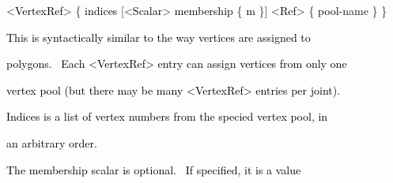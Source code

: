 \documentclass[a4paper]{article}
\newcommand\textstyleOOoComputerKeyWord[1]{\textrm{\textcolor[rgb]{0.0,0.0,0.5019608}{#1}}}
\newcommand\textstyleOOoAssemblerSpecialChar[1]{\textrm{\textcolor[rgb]{0.0,0.5019608,0.0}{#1}}}
\newcommand\textstyleOOoAssemblerIdent[1]{\textrm{\textcolor{black}{#1}}}
\newcommand\textstyleOOoAssemblerDirective[1]{\textrm{\textcolor[rgb]{0.0,0.5019608,1.0}{#1}}}
\begin{document}
{\color{black}
\textstyleOOoComputerKeyWord{\textcolor{black}{\ \ }}\textstyleOOoAssemblerSpecialChar{{\textless}}\textstyleOOoAssemblerIdent{VertexRef}\textstyleOOoAssemblerSpecialChar{{\textgreater}}\textstyleOOoComputerKeyWord{\textcolor{black}{
}}\textstyleOOoAssemblerSpecialChar{\{}\textstyleOOoComputerKeyWord{\textcolor{black}{
}}\textstyleOOoAssemblerIdent{indices}\textstyleOOoComputerKeyWord{\textcolor{black}{
}}\textstyleOOoAssemblerSpecialChar{[{\textless}}\textstyleOOoAssemblerIdent{Scalar}\textstyleOOoAssemblerSpecialChar{{\textgreater}}\textstyleOOoComputerKeyWord{\textcolor{black}{
}}\textstyleOOoAssemblerIdent{membership}\textstyleOOoComputerKeyWord{\textcolor{black}{
}}\textstyleOOoAssemblerSpecialChar{\{}\textstyleOOoComputerKeyWord{\textcolor{black}{
}}\textstyleOOoAssemblerIdent{m}\textstyleOOoComputerKeyWord{\textcolor{black}{
}}\textstyleOOoAssemblerSpecialChar{\}]}\textstyleOOoComputerKeyWord{\textcolor{black}{
}}\textstyleOOoAssemblerSpecialChar{{\textless}}\textstyleOOoAssemblerIdent{Ref}\textstyleOOoAssemblerSpecialChar{{\textgreater}}\textstyleOOoComputerKeyWord{\textcolor{black}{
}}\textstyleOOoAssemblerSpecialChar{\{}\textstyleOOoComputerKeyWord{\textcolor{black}{
}}\textstyleOOoAssemblerIdent{pool}\textstyleOOoAssemblerSpecialChar{{}-}\textstyleOOoAssemblerDirective{name}\textstyleOOoComputerKeyWord{\textcolor{black}{
}}\textstyleOOoAssemblerSpecialChar{\}}\textstyleOOoComputerKeyWord{\textcolor{black}{
}}\textstyleOOoAssemblerSpecialChar{\}}}


\bigskip

{\color{black}
\textstyleOOoComputerKeyWord{\textcolor{black}{\ \ This is syntactically similar to the way vertices are assigned to}}}

{\color{black}
\textstyleOOoComputerKeyWord{\textcolor{black}{\ \ polygons. \ Each {\textless}VertexRef{\textgreater} entry can assign
vertices from only one}}}

{\color{black}
\textstyleOOoComputerKeyWord{\textcolor{black}{\ \ vertex pool (but there may be many {\textless}VertexRef{\textgreater}
entries per joint).}}}

{\color{black}
\textstyleOOoComputerKeyWord{\textcolor{black}{\ \ Indices is a list of vertex numbers from the specied vertex pool,
in}}}

{\color{black}
\textstyleOOoComputerKeyWord{\textcolor{black}{\ \ an arbitrary order.}}}

{\color{black}
\textstyleOOoComputerKeyWord{\textcolor{black}{\ \ The membership scalar is optional. \ If specified, it is a value}}}
\end{document}
